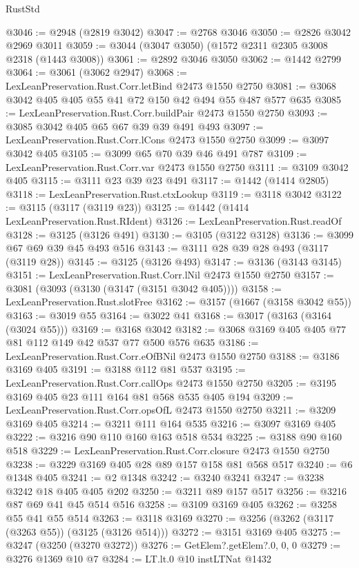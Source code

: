 \begin{lexlean}{RustStd}
\begin{coremodule}
@3046 := @2948 (@2819 @3042)
@3047 := @2768 @3046
@3050 := @2826 @3042 @2969 @3011
@3059 := @3044 (@3047 @3050) (@1572 @2311 @2305 @3008 @2318 (@1443 @3008))
@3061 := @2892 @3046 @3050
@3062 := @1442 @2799
@3064 := @3061 (@3062 @2947)
@3068 := LexLeanPreservation.Rust.Corr.letBind @2473 @1550 @2750
@3081 := @3068 @3042 @405 @405 @55 @41 @72 @150 @42 @494 @55 @487 @577 @635
@3085 := LexLeanPreservation.Rust.Corr.buildPair @2473 @1550 @2750
@3093 := @3085 @3042 @405 @65 @67 @39 @39 @491 @493
@3097 := LexLeanPreservation.Rust.Corr.lCons @2473 @1550 @2750
@3099 := @3097 @3042 @405
@3105 := @3099 @65 @70 @39 @46 @491 @787
@3109 := LexLeanPreservation.Rust.Corr.var @2473 @1550 @2750
@3111 := @3109 @3042 @405
@3115 := @3111 @23 @39 @23 @491
@3117 := @1442 (@1414 @2805)
@3118 := LexLeanPreservation.Rust.ctxLookup
@3119 := @3118 @3042
@3122 := @3115 (@3117 (@3119 @23))
@3125 := @1442 (@1414 LexLeanPreservation.Rust.RIdent)
@3126 := LexLeanPreservation.Rust.readOf
@3128 := @3125 (@3126 @491)
@3130 := @3105 (@3122 @3128)
@3136 := @3099 @67 @69 @39 @45 @493 @516
@3143 := @3111 @28 @39 @28 @493 (@3117 (@3119 @28))
@3145 := @3125 (@3126 @493)
@3147 := @3136 (@3143 @3145)
@3151 := LexLeanPreservation.Rust.Corr.lNil @2473 @1550 @2750
@3157 := @3081 (@3093 (@3130 (@3147 (@3151 @3042 @405))))
@3158 := LexLeanPreservation.Rust.slotFree
@3162 := @3157 (@1667 (@3158 @3042 @55))
@3163 := @3019 @55
@3164 := @3022 @41
@3168 := @3017 (@3163 (@3164 (@3024 @55)))
@3169 := @3168 @3042
@3182 := @3068 @3169 @405 @405 @77 @81 @112 @149 @42 @537 @77 @500 @576 @635
@3186 := LexLeanPreservation.Rust.Corr.eOfBNil @2473 @1550 @2750
@3188 := @3186 @3169 @405
@3191 := @3188 @112 @81 @537
@3195 := LexLeanPreservation.Rust.Corr.callOps @2473 @1550 @2750
@3205 := @3195 @3169 @405 @23 @111 @164 @81 @568 @535 @405 @194
@3209 := LexLeanPreservation.Rust.Corr.opsOfL @2473 @1550 @2750
@3211 := @3209 @3169 @405
@3214 := @3211 @111 @164 @535
@3216 := @3097 @3169 @405
@3222 := @3216 @90 @110 @160 @163 @518 @534
@3225 := @3188 @90 @160 @518
@3229 := LexLeanPreservation.Rust.Corr.closure @2473 @1550 @2750
@3238 := @3229 @3169 @405 @28 @89 @157 @158 @81 @568 @517
@3240 := @6 @1348 @405
@3241 := @2 @1348
@3242 := @3240 @3241
@3247 := @3238 @3242 @18 @405 @405 @202
@3250 := @3211 @89 @157 @517
@3256 := @3216 @87 @69 @41 @45 @514 @516
@3258 := @3109 @3169 @405
@3262 := @3258 @55 @41 @55 @514
@3263 := @3118 @3169
@3270 := @3256 (@3262 (@3117 (@3263 @55)) (@3125 (@3126 @514)))
@3272 := @3151 @3169 @405
@3275 := @3247 (@3250 (@3270 @3272))
@3276 := GetElem?.getElem?.{0, 0, 0}
@3279 := @3276 @1369 @10 @7
@3284 := LT.lt.{0} @10 instLTNat @1432

\end{coremodule}
\end{lexlean}
